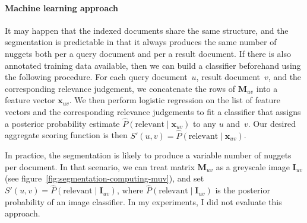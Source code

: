 \documentclass[
  digital, %
  notable, %
  lof,     %
  lot,     %
  nopalatino, color
]{fithesis3}
\let\subsubsection=\paragraph
\begin{document}
\subsubsection{Machine learning approach}
It may happen that the indexed documents share the same structure, and the
segmentation is predictable in that it always produces the same number of
nuggets both per a query document and per a result document. If there is also
annotated training data available, then we can build a classifier beforehand
using the following procedure. For each query document~$u$, result document~$v$,
and the corresponding relevance judgement, we concatenate the rows of
$\mathbf{M}_{uv}$ into a feature vector
$\mathbf{x}_{uv}$. We then perform logistic
regression on the list of feature vectors and the corresponding relevance
judgements to fit a classifier that assigns a posterior probability estimate
$\hat P(\textrm{relevant}\mid\mathbf{x}_{uv})$ to any $u$ and~$v$.  Our desired
aggregate scoring function is then $S'(u, v) = \hat
P(\textrm{relevant}\mid\mathbf{x}_{uv})$.

In practice, the segmentation is likely to produce a variable number of nuggets
per document. In that scenario, we can treat matrix
$\mathbf{M}_{uv}$ as a greyscale image
$\mathbf{I}_{uv}$ (see
figure~\ref{fig:segmentation-computing-muv}), and set
$S'(u, v)=\hat P(\textrm{relevant}\mid\mathbf{I}_{uv})$, where $\hat
P(\textrm{relevant}\mid\mathbf{I}_{uv})$ is the posterior probability of an
image classifier. In my experiments, I did not evaluate this approach.
\end{document}
